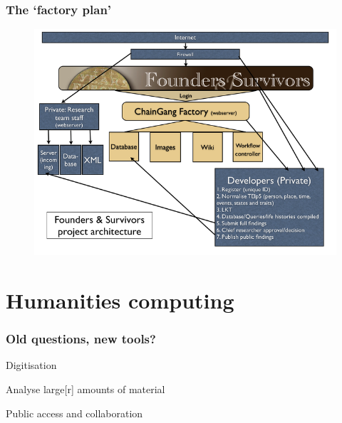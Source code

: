 \documentclass[ignorenonframetext,11pt]{beamer}
\begin{document}
\begin{frame}
\frametitle{The `factory plan'}
\label{thefactoryplan}

\begin{figure}
	\label{factory}
	\begin{center}
	\includegraphics[keepaspectratio,width=\textwidth, height=.75\textheight]{images/factory33.png}
	\end{center}
	\end{figure}
	



\end{frame}
		

\section{Humanities computing}
\label{humanitiescomputing}

\begin{frame}
\frametitle{Old questions, new tools?}
\label{oldquestionsnewtools}

Digitisation


Analyse large[r] amounts of material


Public access and collaboration



\end{frame}
		
\end{document}
